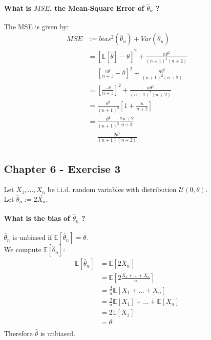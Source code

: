 \documentclass{article}
\newcommand{\E}{\mathbb{E}}
\newcommand{\thetahat}{\hat\theta}
\begin{document}
\paragraph{What is \(MSE\), the Mean-Square Error of \(\hat\theta_n\) ?\\}
The MSE is given by:
\begin{align*}
    MSE
     & := bias^2 (\thetahat_n) + Var(\thetahat_n)                                          \\
     & = \left[ \E[\thetahat] - \theta \right]^2 + \frac{n \theta^2}{(n+1)^2 (n+2)}        \\
     & = \left[ \frac{n \theta}{n+1} - \theta \right]^2 + \frac{n \theta^2}{(n+1)^2 (n+2)} \\
     & = \left[ \frac{-\theta}{n+1} \right]^2 + \frac{n \theta^2}{(n+1)^2 (n+2)}           \\
     & = \frac{\theta^2}{(n+1)^2} \left[ 1 + \frac{n}{n+2} \right]                         \\
     & = \frac{\theta^2}{(n+1)^2} \frac{2n+2}{n+2}                                         \\
     & = \frac{2 \theta^2}{(n+1)(n+2)}                                                     \\
\end{align*}


\subsection{Chapter 6 - Exercise 3}

Let \(X_1, \ldots, X_n\) be i.i.d. random variables with distribution \(\mathcal{U}(0, \theta)\). \\
Let \(\hat\theta_n := 2 \bar{X_n}\).

\paragraph{What is the bias of \(\hat\theta_n\) ?\\}
\(\hat\theta_n\) is unbiased if \(\E[\hat\theta_n] = \theta\). \\
We compute \(\E[\thetahat_n]\):
\begin{align*}
    \E[\thetahat_n]
     & = \E \left[2\bar{X}_n \right]                                       \\
     & = \E \left[2\frac{X_1 + \ldots + X_n}{n} \right]                    \\
     & = \frac{2}{n} \E \left[X_1 + \ldots + X_n \right]                   \\
     & = \frac{2}{n} \E \left[X_1 \right] + \ldots + \E \left[ X_n \right] \\
     & = 2\E \left[X_1 \right]                                             \\
     & = \theta                                                            \\
\end{align*}
Therefore \(\thetahat\) is unbiased.
\end{document}
